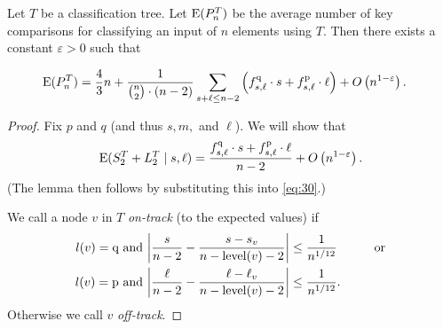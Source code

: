 \documentclass[prodmode,acmtalg]{acmsmall}
\newcommand{\E}{\textnormal{\textrm{E}}}
\begin{document}
\begin{lemma}\label{lemma:01}
Let $T$ be a classification tree. Let $\E(P^T_n)$ be the average number of 
key comparisons for classifying an input of $n$ elements using $T$. 
Then there exists a constant $\varepsilon > 0$ such that 
\begin{rm}
\begin{align*}
    \E(P^T_n) &= \frac{4}{3}n  +  \frac{1}{\binom{n}{2} 
    \cdot (n-2)} \sum_{s+\ell \leq n-2}\left(f^{\text{q}}_{s,\ell} \cdot s + f^{\text{p}}_{s,\ell} \cdot
\ell\right)+ O\left(n^{1-\varepsilon}\right).
\end{align*}\end{rm}\end{lemma}
\begin{proof}
    Fix $p$ and $q$ (and thus $s, m,$ and $\ell$). We will show that 
    \begin{align}\label{eq:20000}
     \E(S^T_2+ L^T_2 \mid s, \ell) = \frac{f^{\text{q}}_{s,\ell} \cdot s + f^{\text{p}}_{s,\ell} \cdot
\ell}{n-2} + O\left(n^{1-\varepsilon}\right).
    \end{align}
    (The lemma then follows by substituting this into \eqref{eq:30}.)

    We call a node $v$ in $T$ \emph{on-track} (to the expected values)  if 
    \begin{align}
        l(v) = \text{q} \text{ and } \bigg|\frac{s}{n-2} - \frac{s - s_v}{n - \textnormal{\textrm{level}}(v) - 2}\bigg| &\leq
        \frac{1}{n^{1/12}} \quad\quad\quad\text{or} \notag\\
        l(v) = \text{p} \text{ and } \bigg|\frac{\ell}{n-2} - \frac{\ell - \ell_v}{n - \textnormal{\textrm{level}}(v) - 2}\bigg|
        &\leq \frac{1}{n^{1/12}}.\label{eq:v:good}
    \end{align}
    Otherwise we call $v$ \emph{off-track}.
    

\end{proof}
\end{document}
